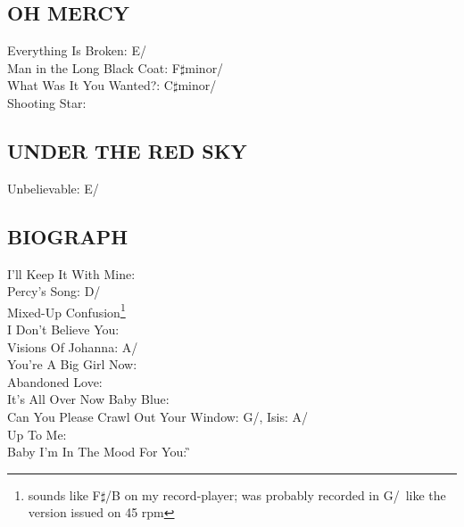 \subsection{OH MERCY}
Everything Is Broken: E/\A\\ Man in the Long Black Coat: F$\sharp$minor/\A\\ What Was It You Wanted?: C$\sharp$minor/\E\\ Shooting Star: \E


\subsection{UNDER THE RED SKY}
Unbelievable: E/\A


\subsection{BIOGRAPH}
I'll Keep It With Mine: \C\\ Percy's Song: D/\G\\ Mixed-Up Confusion\footnote{sounds like F$\sharp$/B on my
record-player; was probably recorded in G/\C\ like the version issued
on 45 rpm}\\ I Don't Believe You: \E\\ Visions Of Johanna: A/\D\\ You're A Big Girl Now: \E\\ Abandoned Love: \G\\ It's All Over Now Baby Blue: \D\\ Can You Please Crawl Out Your Window: G/\C,
Isis: A/\D\\ Up To Me: \E\\ Baby I'm In The Mood For You: \G


